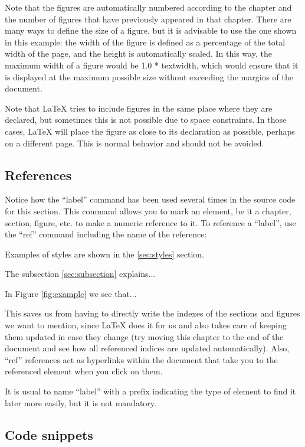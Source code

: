 Note that the figures are automatically numbered according to the chapter and the number of figures that have previously appeared in that chapter. There are many ways to define the size of a figure, but it is advisable to use the one shown in this example: the width of the figure is defined as a percentage of the total width of the page, and the height is automatically scaled. In this way, the maximum width of a figure would be 1.0 * textwidth, which would ensure that it is displayed at the maximum possible size without exceeding the margins of the document.

Note that LaTeX tries to include figures in the same place where they are declared, but sometimes this is not possible due to space constraints. In those cases, LaTeX will place the figure as close to its declaration as possible, perhaps on a different page. This is normal behavior and should not be avoided.

\subsection{References}
Notice how the ``label'' command has been used several times in the source code for this section. This command allows you to mark an element, be it a chapter, section, figure, etc. to make a numeric reference to it. To reference a ``label'', use the ``ref'' command including the name of the reference:


Examples of styles are shown in the \ref{sec:styles} section.

The subsection \ref{sec:subsection} explains...

In Figure \ref{fig:example} we see that...

This saves us from having to directly write the indexes of the sections and figures we want to mention, since LaTeX does it for us and also takes care of keeping them updated in case they change (try moving this chapter to the end of the document and see how all referenced indices are updated automatically). Also, ``ref'' references act as hyperlinks within the document that take you to the referenced element when you click on them.

It is usual to name ``label'' with a prefix indicating the type of element to find it later more easily, but it is not mandatory.

\subsection{Code snippets}

